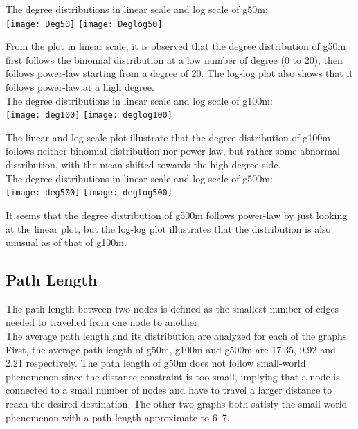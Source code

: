 The degree distributions in linear scale and log scale of g50m:\\
\texttt{[image: Deg50]}
\texttt{[image: Deglog50]}

From the plot in linear scale, it is observed that the degree distribution of g50m first follows the binomial distribution at a low number of degree (0 to 20), then follows power-law starting from a degree of 20. The log-log plot also shows that it follows power-law at a high degree. \\

The degree distributions in linear scale and log scale of g100m:\\
\texttt{[image: deg100]}
\texttt{[image: deglog100]}

The linear and log scale plot illustrate that the degree distribution of g100m follows neither binomial distribution nor power-law, but rather some abnormal distribution, with the mean shifted towards the high degree side. \\

The degree distributions in linear scale and log scale of g500m:\\
\texttt{[image: deg500]}
\texttt{[image: deglog500]}

It seems that the degree distribution of g500m follows power-law by just looking at the linear plot, but the log-log plot illustrates that the distribution is also unusual as of that of g100m. \\

\subsection{Path Length}
The path length between two nodes is defined as the smallest number of edges needed to travelled from one node to another. \\

The average path length and its distribution are analyzed for each of the graphs. First, the average path length of g50m, g100m and g500m are 17.35, 9.92 and 2.21 respectively. The path length of g50m does not follow small-world phenomenon since the distance constraint is too small, implying that a node is connected to a small number of nodes and have to travel a larger distance to reach the desired destination. The other two graphs both satisfy the small-world phenomenon with a path length approximate to 6~7. \\ 


